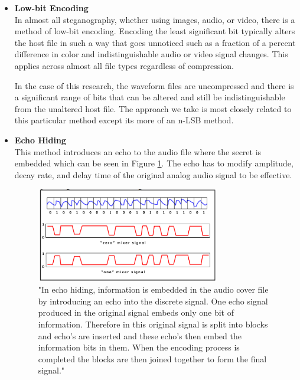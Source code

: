 \documentclass[letterpaper]{article}
\begin{document}
\begin{itemize}

\item \textbf{Low-bit Encoding}\\
In almost all steganography, whether using images, audio, or video, there is a method of low-bit encoding. Encoding the least significant bit typically alters the host file in such a way that goes unnoticed such as a fraction of a percent difference in color and indistinguishable audio or video signal changes. This applies across almost all file types regardless of compression. 

In the case of this research, the waveform files are uncompressed and there is a significant range of bits that can be altered and still be indistinguishable from the unaltered host file. The approach we take is most closely related to this particular method except its more of an n-LSB method. 



\item \textbf{Echo Hiding}\\
This method introduces an echo to the audio file where the secret is embedded which can be seen in Figure \ref{fig:echo}.\cite{kaur2015data} 
The echo has to modify amplitude, decay rate, and delay time of the original analog audio signal to be effective.  \cite{meghanathan2010steganalysis}

\begin{figure}[h]
    \centering
    \includegraphics[width=8cm]{images/echo.png}
    \caption{"In echo hiding, information is embedded in the audio cover file by introducing an echo into the discrete signal. One echo
signal produced in the original signal embeds only one bit of information. Therefore in this original signal is split into
blocks and echo’s are inserted and these echo’s then embed the information bits in them. When the encoding process is
completed the blocks are then joined together to form the final signal."}
    \label{fig:echo}
    
\end{figure}



\end{itemize}
\end{document}
